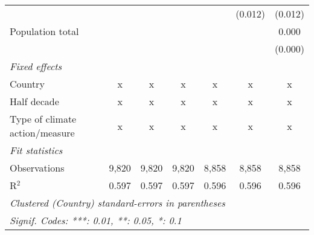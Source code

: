 \begin{tabular}{lcccccc}
                                                     &               &               &               &                & (0.012)        & (0.012)\\   
   Population total                                  &               &               &               &                &                & 0.000\\   
                                                     &               &               &               &                &                & (0.000)\\   
   \emph{Fixed effects}\\
   Country                                           & x             & x             & x             & x              & x              & x\\  
   Half decade                                       & x             & x             & x             & x              & x              & x\\  
   Type of climate action/measure                    & x             & x             & x             & x              & x              & x\\  
   \midrule \emph{Fit statistics}\\
   Observations                                      & 9,820         & 9,820         & 9,820         & 8,858          & 8,858          & 8,858\\  
   R$^2$                                             & 0.597         & 0.597         & 0.597         & 0.596          & 0.596          & 0.596\\  
   \midrule
   \multicolumn{7}{l}{\emph{Clustered (Country) standard-errors in parentheses}}\\
   \multicolumn{7}{l}{\emph{Signif. Codes: ***: 0.01, **: 0.05, *: 0.1}}\\
\end{tabular}
\par\endgroup



